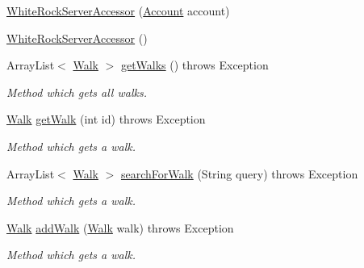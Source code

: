 \begin{DoxyCompactItemize}
\item 
\hyperlink{classuk_1_1ac_1_1swan_1_1digitaltrails_1_1sync_1_1_white_rock_server_accessor_a8eead67f91e0513d71e0f5597387c558}{White\+Rock\+Server\+Accessor} (\hyperlink{classuk_1_1ac_1_1swan_1_1digitaltrails_1_1components_1_1_account}{Account} account)
\item 
\hyperlink{classuk_1_1ac_1_1swan_1_1digitaltrails_1_1sync_1_1_white_rock_server_accessor_a075564cd65915ba99e5954324414c2a4}{White\+Rock\+Server\+Accessor} ()
\item 
Array\+List$<$ \hyperlink{classuk_1_1ac_1_1swan_1_1digitaltrails_1_1components_1_1_walk}{Walk} $>$ \hyperlink{classuk_1_1ac_1_1swan_1_1digitaltrails_1_1sync_1_1_white_rock_server_accessor_a85f7e2ab2b091c0eaae18852b7f2a77b}{get\+Walks} ()  throws Exception 
\begin{DoxyCompactList}\small\item\em Method which gets all walks. \end{DoxyCompactList}\item 
\hyperlink{classuk_1_1ac_1_1swan_1_1digitaltrails_1_1components_1_1_walk}{Walk} \hyperlink{classuk_1_1ac_1_1swan_1_1digitaltrails_1_1sync_1_1_white_rock_server_accessor_a90970621c8bc1cb33a480653552056e8}{get\+Walk} (int id)  throws Exception 
\begin{DoxyCompactList}\small\item\em Method which gets a walk. \end{DoxyCompactList}\item 
Array\+List$<$ \hyperlink{classuk_1_1ac_1_1swan_1_1digitaltrails_1_1components_1_1_walk}{Walk} $>$ \hyperlink{classuk_1_1ac_1_1swan_1_1digitaltrails_1_1sync_1_1_white_rock_server_accessor_a5dd9fccd110520c95edaa21bc17b90b3}{search\+For\+Walk} (String query)  throws Exception 
\begin{DoxyCompactList}\small\item\em Method which gets a walk. \end{DoxyCompactList}\item 
\hyperlink{classuk_1_1ac_1_1swan_1_1digitaltrails_1_1components_1_1_walk}{Walk} \hyperlink{classuk_1_1ac_1_1swan_1_1digitaltrails_1_1sync_1_1_white_rock_server_accessor_a1295558ae97a6f0109e836f6b3c63003}{add\+Walk} (\hyperlink{classuk_1_1ac_1_1swan_1_1digitaltrails_1_1components_1_1_walk}{Walk} walk)  throws Exception 
\begin{DoxyCompactList}\small\item\em Method which gets a walk. \end{DoxyCompactList}\item 

\end{DoxyCompactItemize}
